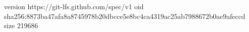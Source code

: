version https://git-lfs.github.com/spec/v1
oid sha256:8873ba47afa8a8745978b20dbcce5e8bc4ca4319ac25ab7988672b0ae9afeccd
size 219686
